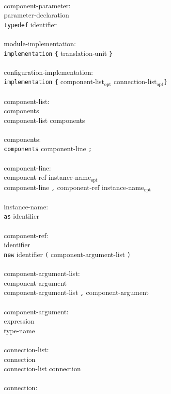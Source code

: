 \documentclass[11pt,letterpaper]{article}
\newcommand{\kw}[1]{{\tt #1}}
\newcommand{\opt}{$_{\mbox{opt}}$\xspace}
\begin{document}
\begin{tabbing}
\\
component-parameter:\\
\>	parameter-declaration\\
\>	\kw{typedef} identifier\\
\\
module-implementation:\\
\>	\kw{implementation} \kw{\{} translation-unit \kw{\}}\\
\\
configuration-implementation:\\
\>	\kw{implementation} \kw{\{} component-list\opt connection-list\opt \kw{\}}\\
\\
component-list:\\
\>	components\\
\>	component-list components\\
\\
components:\\
\>	\kw{components} component-line \kw{;}\\
\\
component-line:\\
\>	component-ref instance-name\opt\\
\>	component-line \kw{,} component-ref instance-name\opt\\
\\
instance-name:\\
\>	\kw{as} identifier\\
\\
component-ref:\\
\>	identifier\\
\>	\kw{new} identifier \kw{(} component-argument-list \kw{)}\\
\\
component-argument-list:\\
\>	component-argument\\
\>	component-argument-list \kw{,} component-argument\\
\\
component-argument:\\
\>	expression\\
\>	type-name\\
\\
connection-list:\\
\>	connection\\
\>	connection-list connection\\
\\
connection:\\

\end{tabbing}
\end{document}

